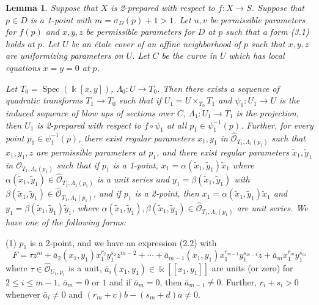 \documentclass[11pt]{article}
\theoremstyle{plain}
\newtheorem{lemma}{Lemma}
\newcommand{\Oh}[1]{\widehat{\mathcal{O}}_{#1}}
\newcommand{\Spec}{\operatorname{Spec}}
\begin{document}
\begin{lemma}
Suppose that $X$ is 2-prepared with respect to $f : X \to S$. Suppose that $p \in D$ is a 1-point with $m = \sigma_D(p) + 1 > 1$. Let $u, v$ be permissible parameters for $f(p)$ and $x, y, z$ be permissible parameters for $D$ at $p$ such that a form (3.1) holds at $p$. Let $U$ be an \'etale cover of an affine neighborhood of $p$ such that $x, y, z$ are uniformizing parameters on $U$. Let $C$ be the curve in $U$ which has local equations $x = y = 0$ at $p$.

Let $T_0 = \Spec(\Bbbk[x, y])$, $\Lambda_0 : U \to T_0$. Then there exists a sequence of quadratic transforms $T_1 \to T_0$ such that if $U_1 = U \times_{T_0} T_1$ and $\psi_1 : U_1 \to U$ is the induced sequence of blow ups of sections over $C$, $\Lambda_1 : U_1 \to T_1$ is the projection, then $U_1$ is 2-prepared with respect to $f \circ \psi_1$ at all $p_1 \in \psi_1^{-1}(p)$. Further, for every point $p_1 \in \psi_1^{-1}(p)$, there exist regular parameters $x_1, y_1$ in $\Oh{T_1,\Lambda_1(p_1)}$ such that $x_1, y_1, z$ are permissible parameters at $p_1$, and there exist regular parameters $\tilde{x}_1, \tilde{y}_1$ in $\mathcal{O}_{T_1,\Lambda_1(p_1)}$ such that if $p_1$ is a 1-point, $x_1 = \alpha(\tilde{x}_1, \tilde{y}_1)\tilde{x}_1$ where $\alpha(\tilde{x}_1, \tilde{y}_1) \in \Oh{T_1,\Lambda_1(p_1)}$ is a unit series and $y_1 = \beta(\tilde{x}_1, \tilde{y}_1)$ with $\beta(\tilde{x}_1, \tilde{y}_1) \in \Oh{T_1,\Lambda_1(p_1)}$, and if $p_1$ is a 2-point, then $x_1 = \alpha(\tilde{x}_1, \tilde{y}_1)\tilde{x}_1$ and $y_1 = \beta(\tilde{x}_1, \tilde{y}_1)\tilde{y}_1$, where $\alpha(\tilde{x}_1, \tilde{y}_1), \beta(\tilde{x}_1, \tilde{y}_1) \in \Oh{T_1,\Lambda_1(p_1)}$ are unit series.
We have one of the following forms:
\end{lemma}


(1) $p_1$ is a 2-point, and we have an expression (2.2) with
\begin{equation}
F = \tau z^m + \bar{a}_2(x_1, y_1) x_1^{r_2} y_1^{s_2} z^{m-2} + \cdots + \bar{a}_{m-1}(x_1, y_1) x_1^{r_{m-1}} y_1^{s_{m-1}} z + \bar{a}_m x_1^{r_m} y_1^{s_m}
\tag{3.10}
\end{equation}
where $\tau \in \Oh{U_1,p_1}$ is a unit, $\bar{a}_i(x_1, y_1) \in \Bbbk[[x_1, y_1]]$ are units (or zero) for $2 \leqslant i \leqslant m-1$, $\bar{a}_m = 0$ or $1$ and if $\bar{a}_m = 0$, then $\bar{a}_{m-1} \neq 0$. Further, $r_i + s_i > 0$ whenever $\bar{a}_i \neq 0$ and $(r_m + c)b - (s_m + d)a \neq 0$.
\end{document}

